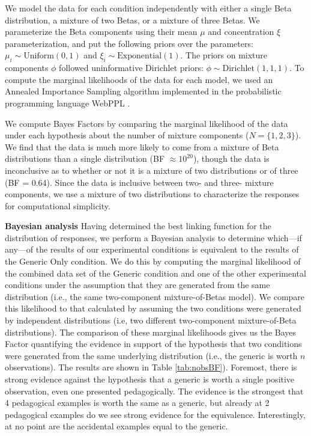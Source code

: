 \documentclass[10pt,letterpaper]{article}
\begin{document}
We model the data for each condition independently with either a single Beta distribution, a mixture of two Betas, or a mixture of three Betas.
We parameterize the Beta components using their mean $\mu$ and concentration $\xi$ parameterization, and put the following priors over the parameters: $\mu_i \sim \text{Uniform}(0,1)$ and $\xi_i \sim \text{Exponential}(1)$. 
The priors on mixture components $\phi$ followed uninformative Dirichlet priors: $\phi \sim \text{Dirichlet}(1, 1, 1)$.
To compute the marginal likelihoods of the data for each model, we used an Annealed Importance Sampling algorithm \cite{neal2001annealed} implemented in the probabilistic programming language WebPPL \cite{dippl}. 

We compute Bayes Factors by comparing the marginal likelihood of the data under each hypothesis about the number of mixture components ($N = \{1, 2, 3\}$).
We find that the data is much more likely to come from a mixture of Beta distributions than a single distribution (BF $\approx 10^{20}$), though the data is inconclusive as to whether or not it is a mixture of two distributions or of three (BF = 0.64). %
Since the data is inclusive between two- and three- mixture components, we use a mixture of two distributions to characterize the responses for computational simplicity. 

\noindent\textbf{Bayesian analysis}
Having determined the best linking function for the distribution of responses, we perform a Bayesian analysis to determine which---if any---of the results of our experimental conditions is equivalent to the results of the Generic Only condition. 
We do this by computing the marginal likelihood of the combined data set of the Generic condition and one of the other experimental conditions under the assumption that they are generated from the same distribution (i.e., the same two-component mixture-of-Betas model). 
We compare this likelihood to that calculated by assuming the two conditions were generated by independent distributions (i.e, two different two-component mixture-of-Beta distributions). 
The comparison of these marginal likelihoods gives us the Bayes Factor quantifying the evidence in support of the hypothesis that two conditions were generated from the same underlying distribution (i.e., the generic is worth $n$ observations). 
The results are shown in Table \ref{tab:nobsBF}).
Foremost, there is strong evidence against the hypothesis that a generic is worth a single positive observation, even one presented pedagogically.
The evidence is the strongest that 4 pedagogical examples is worth the same as a generic, but already at 2 pedagogical examples do we see strong evidence for the equivalence. 
Interestingly, at no point are the accidental examples equal to the generic.
\end{document}
